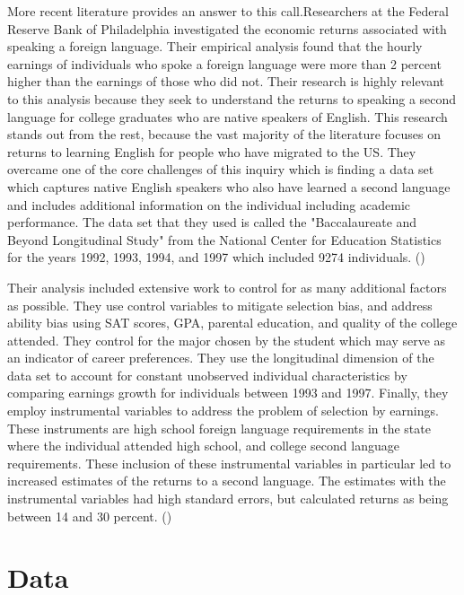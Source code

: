 \documentclass[12pt,english]{article}
\begin{document}
More recent literature provides an answer to this call.Researchers at the Federal Reserve Bank of Philadelphia investigated the economic returns associated with speaking a foreign language. Their empirical analysis found that the hourly earnings of individuals who spoke a foreign language were more than 2 percent higher than the earnings of those who did not. Their research is highly relevant to this analysis because they seek to understand the returns to speaking a second language for college graduates who are native speakers of English. This research stands out from the rest, because the vast majority of the literature focuses on returns to learning English for people who have migrated to the US. They overcame one of the core challenges of this inquiry which is finding a data set which captures native English speakers who also have learned a second language and includes additional information on the individual including academic performance. The data set that they used is called the "Baccalaureate and Beyond Longitudinal Study" from the National Center for Education Statistics for the years 1992, 1993, 1994, and 1997 which included 9274 individuals. (\citet{Fed})

Their analysis included extensive work to control for as many additional factors as possible. They use control variables to mitigate selection bias, and address ability bias using SAT scores, GPA, parental education, and quality of the college attended. They control for the major chosen by the student which may serve as an indicator of career preferences. They use the longitudinal dimension of the data set to account for constant unobserved individual characteristics by comparing earnings growth for individuals between 1993 and 1997. Finally, they employ instrumental variables to address the problem of selection by earnings. These instruments are high school foreign language requirements in the state where the individual attended high school, and college second language requirements. These inclusion of these instrumental variables in particular led to increased estimates of the returns to a second language. The estimates with the instrumental variables had high standard errors, but calculated returns as being between 14 and 30 percent. (\citet{Fed})



\section{Data}\label{sec:data}
\end{document}
